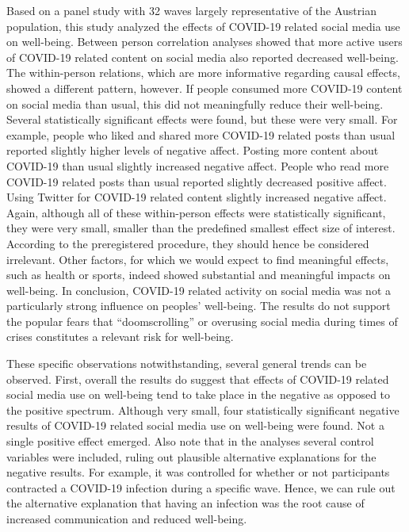 \documentclass[
  man,floatsintext]{apa7}
\begin{document}
Based on a panel study with 32 waves largely representative of the Austrian population, this study analyzed the effects of COVID-19 related social media use on well-being.
Between person correlation analyses showed that more active users of COVID-19 related content on social media also reported decreased well-being.
The within-person relations, which are more informative regarding causal effects, showed a different pattern, however.
If people consumed more COVID-19 content on social media than usual, this did not meaningfully reduce their well-being.
Several statistically significant effects were found, but these were very small.
For example, people who liked and shared more COVID-19 related posts than usual reported slightly higher levels of negative affect.
Posting more content about COVID-19 than usual slightly increased negative affect.
People who read more COVID-19 related posts than usual reported slightly decreased positive affect.
Using Twitter for COVID-19 related content slightly increased negative affect.
Again, although all of these within-person effects were statistically significant, they were very small, smaller than the predefined smallest effect size of interest.
According to the preregistered procedure, they should hence be considered irrelevant.
Other factors, for which we would expect to find meaningful effects, such as health or sports, indeed showed substantial and meaningful impacts on well-being.
In conclusion, COVID-19 related activity on social media was not a particularly strong influence on peoples' well-being.
The results do not support the popular fears that ``doomscrolling'' or overusing social media during times of crises constitutes a relevant risk for well-being.

These specific observations notwithstanding, several general trends can be observed.
First, overall the results do suggest that effects of COVID-19 related social media use on well-being tend to take place in the negative as opposed to the positive spectrum.
Although very small, four statistically significant negative results of COVID-19 related social media use on well-being were found.
Not a single positive effect emerged.
Also note that in the analyses several control variables were included, ruling out plausible alternative explanations for the negative results.
For example, it was controlled for whether or not participants contracted a COVID-19 infection during a specific wave.
Hence, we can rule out the alternative explanation that having an infection was the root cause of increased communication and reduced well-being.
\end{document}
